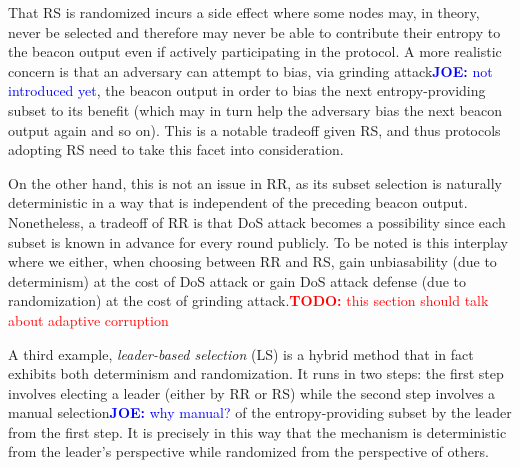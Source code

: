 \documentclass[letterpaper,twocolumn,10pt]{article}
\theoremstyle{definition}
\theoremstyle{remark}
\newcommand{\todo}[1]{\textcolor{red}{\textbf{TODO:} #1}}
\newcommand{\joenote}[1]{\textcolor{blue}{\textbf{JOE:} #1}}
\begin{document}
That RS is randomized incurs a side effect where some nodes may, in theory, never be selected and therefore may never be able to contribute their entropy to the beacon output even if actively participating in the protocol. A more realistic concern is that an adversary can attempt to bias, via grinding attack\joenote{not introduced yet}, the beacon output in order to bias the next entropy-providing subset to its benefit (which may in turn help the adversary bias the next beacon output again and so on). This is a notable tradeoff given RS, and thus protocols adopting RS need to take this facet into consideration.

On the other hand, this is not an issue in RR, as its subset selection is naturally deterministic in a way that is independent of the preceding beacon output. Nonetheless, a tradeoff of RR is that DoS attack becomes a possibility since each subset is known in advance for every round publicly. To be noted is this interplay where we either, when choosing between RR and RS, gain unbiasability (due to determinism) at the cost of DoS attack or gain DoS attack defense (due to randomization) at the cost of grinding attack.\todo{this section should talk about adaptive corruption}

A third example, \textit{leader-based selection} (LS) is a hybrid method that in fact exhibits both determinism and randomization. It runs in two steps: the first step involves electing a leader (either by RR or RS) while the second step involves a manual selection\joenote{why manual?} of the entropy-providing subset by the leader from the first step. It is precisely in this way that the mechanism is deterministic from the leader's perspective while randomized from the perspective of others.
\end{document}

